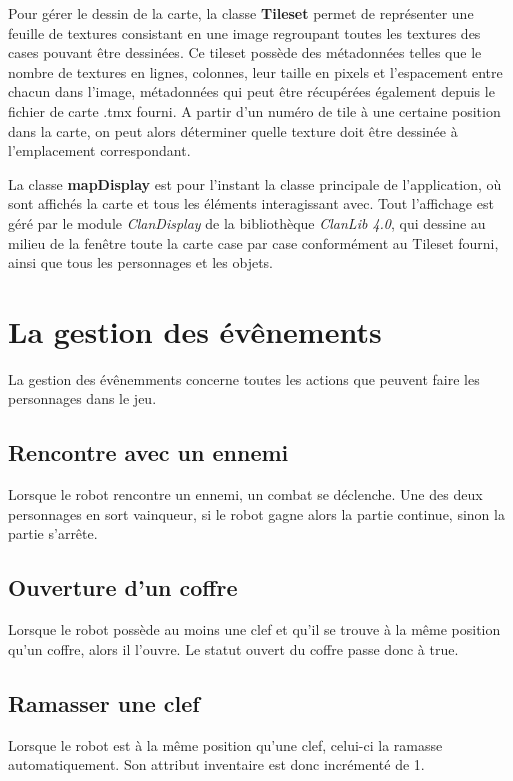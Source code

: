 \documentclass[a4paper,12pts]{article}
\begin{document}
Pour gérer le dessin de la carte, la classe \textbf{Tileset} permet de représenter une feuille de textures consistant en une image regroupant toutes les textures des cases pouvant être dessinées. Ce tileset possède des métadonnées telles que le nombre de textures en lignes, colonnes, leur taille en pixels et l'espacement entre chacun dans l'image, métadonnées qui peut être récupérées également depuis le fichier de carte .tmx fourni. A partir d'un numéro de tile à une certaine position dans la carte, on peut alors déterminer quelle texture doit être dessinée à l'emplacement correspondant. 

La classe \textbf{mapDisplay} est pour l'instant la classe principale de l'application, où sont affichés la carte et tous les éléments interagissant avec. Tout l'affichage est géré par le module \emph{ClanDisplay} de la bibliothèque \emph{ClanLib 4.0}, qui dessine au milieu de la fenêtre toute la carte case par case conformément au Tileset fourni, ainsi que tous les personnages et les objets.

\section{La gestion des évênements}

La gestion des évênemments concerne toutes les actions que peuvent faire les personnages dans le jeu.

\subsection {Rencontre avec un ennemi} 

Lorsque le robot rencontre un ennemi, un combat se déclenche. Une des deux personnages en sort vainqueur, si le robot gagne alors la partie continue, sinon la partie s'arrête.

\subsection {Ouverture d'un coffre}

Lorsque le robot possède au moins une clef et qu'il se trouve à la même position qu'un coffre, alors il l'ouvre. Le statut ouvert du coffre passe donc à true.

\subsection {Ramasser une clef}

Lorsque le robot est à la même position qu'une clef, celui-ci la ramasse automatiquement. Son attribut inventaire est donc incrémenté de 1.
\end{document}
